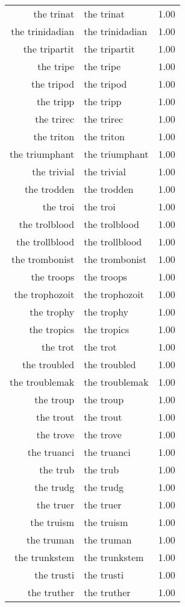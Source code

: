 \begin{table}[ht]
\begin{tabular}{rlr}
  the trinat & the trinat & 1.00 \\ 
  the trinidadian & the trinidadian & 1.00 \\ 
  the tripartit & the tripartit & 1.00 \\ 
  the tripe & the tripe & 1.00 \\ 
  the tripod & the tripod & 1.00 \\ 
  the tripp & the tripp & 1.00 \\ 
  the trirec & the trirec & 1.00 \\ 
  the triton & the triton & 1.00 \\ 
  the triumphant & the triumphant & 1.00 \\ 
  the trivial & the trivial & 1.00 \\ 
  the trodden & the trodden & 1.00 \\ 
  the troi & the troi & 1.00 \\ 
  the trolblood & the trolblood & 1.00 \\ 
  the trollblood & the trollblood & 1.00 \\ 
  the trombonist & the trombonist & 1.00 \\ 
  the troops & the troops & 1.00 \\ 
  the trophozoit & the trophozoit & 1.00 \\ 
  the trophy & the trophy & 1.00 \\ 
  the tropics & the tropics & 1.00 \\ 
  the trot & the trot & 1.00 \\ 
  the troubled & the troubled & 1.00 \\ 
  the troublemak & the troublemak & 1.00 \\ 
  the troup & the troup & 1.00 \\ 
  the trout & the trout & 1.00 \\ 
  the trove & the trove & 1.00 \\ 
  the truanci & the truanci & 1.00 \\ 
  the trub & the trub & 1.00 \\ 
  the trudg & the trudg & 1.00 \\ 
  the truer & the truer & 1.00 \\ 
  the truism & the truism & 1.00 \\ 
  the truman & the truman & 1.00 \\ 
  the trunkstem & the trunkstem & 1.00 \\ 
  the trusti & the trusti & 1.00 \\ 
  the truther & the truther & 1.00 \\ 

\end{tabular}
\end{table}
